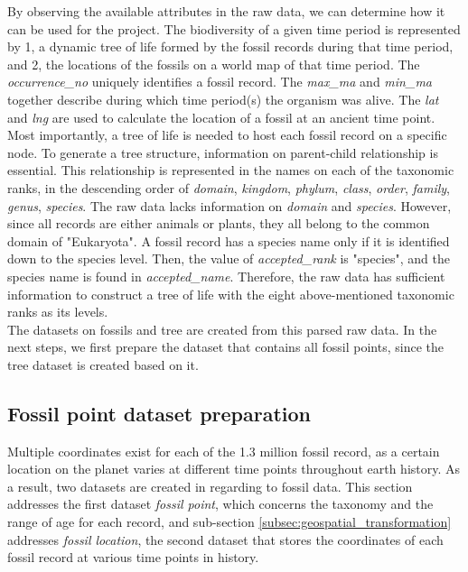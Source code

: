 \documentclass[11pt, a4paper,oneside,chapterprefix=false]{scrbook}
\begin{document}
By observing the available attributes in the raw data, we can determine how it can be used for the project. The biodiversity of a given time period is represented by 1, a dynamic tree of life formed by the fossil records during that time period, and 2, the locations of the fossils on a world map of that time period. The \emph{occurrence\_no} uniquely identifies a fossil record. The \emph{max\_ma} and \emph{min\_ma} together describe during which time period(s) the organism was alive. The \emph{lat} and \emph{lng} are used to calculate the location of a fossil at an ancient time point. Most importantly, a tree of life is needed to host each fossil record on a specific node. To generate a tree structure, information on parent-child relationship is essential. This relationship is represented in the names on each of the taxonomic ranks, in the descending order of \emph{domain}, \emph{kingdom}, \emph{phylum}, \emph{class}, \emph{order}, \emph{family}, \emph{genus}, \emph{species}. The raw data lacks information on \emph{domain} and \emph{species}. However, since all records are either animals or plants, they all belong to the common domain of "Eukaryota". A fossil record has a species name only if it is identified down to the species level. Then, the value of \emph{accepted\_rank} is "species", and the species name is found in \emph{accepted\_name}. Therefore, the raw data has sufficient information to construct a tree of life with the eight above-mentioned taxonomic ranks as its levels.\\

The datasets on fossils and tree are created from this parsed raw data. In the next steps, we first prepare the dataset that contains all fossil points, since the tree dataset is created based on it. 

\subsection{Fossil point dataset preparation}
\label{subsec:fossil_preparation}
Multiple coordinates exist for each of the 1.3 million fossil record, as a certain location on the planet varies at different time points throughout earth history. As a result, two datasets are created in regarding to fossil data. This section addresses the first dataset \emph{fossil point}, which concerns the taxonomy and the range of age for each record, and sub-section \ref{subsec:geospatial_transformation} addresses \emph{fossil location}, the second dataset that stores the coordinates of each fossil record at various time points in history. \\
\end{document}
